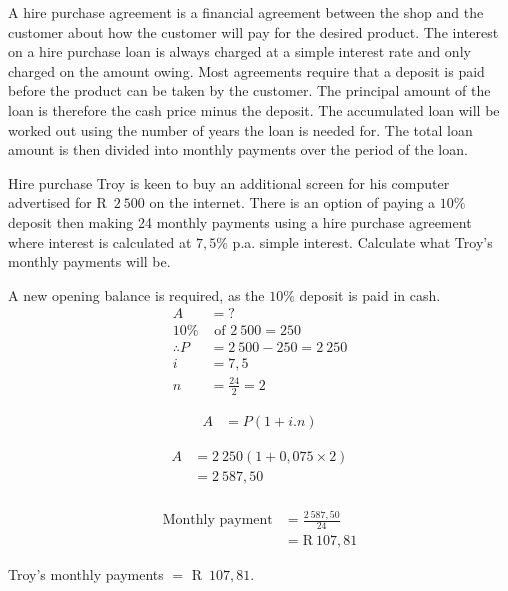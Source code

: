 A hire purchase agreement is a financial agreement between the shop and the customer about how the customer will pay for the desired product. The interest on a hire purchase loan is always charged at a simple interest rate and only charged on the amount owing. Most agreements require that a deposit is paid before the product can be taken by the customer. The principal amount of the loan is therefore the cash price minus the deposit. The accumulated loan will be worked out using the number of years the loan is needed for. The total loan amount is then divided into monthly payments over the period of the loan.


\begin{wex}{Hire purchase}{
    Troy is keen to buy an additional screen for his computer advertised for R~$2~500$ on the internet. There is an option of paying a $10\%$ deposit then making 24 monthly payments using a hire purchase agreement where interest is calculated at $7,5\%$ p.a. simple interest. Calculate what Troy’s monthly payments will be.}{
A new opening balance is required, as the $10\%$ deposit is paid in cash.
    \begin{align*}
	A &= ?\\
10\% &\mbox{ of } 2~500= 250\\
\therefore P &= 2~500-250 =2~250\\
	i &= 7,5\\
	n &= \frac{24}{2} =2
    \end{align*}
   

    \begin{align*}
	    A &= P(1 + i . n)
    \end{align*}

    \begin{align*}
	A &= 2~250(1 + 0,075 \times 2)\\
	  &= 2~587,50\\
    \end{align*}

    \begin{align*}
	\text{Monthly payment} &= \frac{2~587,50}{24}\\
			&= \text{R}~107,81
    \end{align*}

    Troy's monthly payments $=$ R~$107,81$.
}
\end{wex}


